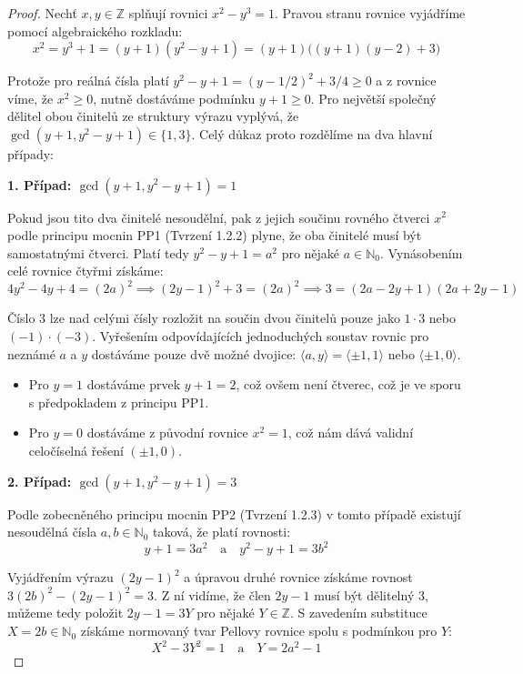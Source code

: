\documentclass[a4paper,12pt]{article}
\begin{document}
\begin{proof}
Nechť $x, y \in \mathbb{Z}$ splňují rovnici $x^2 - y^3 = 1$. Pravou stranu rovnice vyjádříme pomocí algebraického rozkladu:
$$x^2 = y^3 + 1 = (y + 1)(y^2 - y + 1) = (y + 1)\big((y + 1)(y - 2) + 3\big)$$ 

Protože pro reálná čísla platí $y^2 - y + 1 = (y - 1/2)^2 + 3/4 \ge 0$ a z rovnice víme, že $x^2 \ge 0$, nutně dostáváme podmínku $y + 1 \ge 0$. Pro největší společný dělitel obou činitelů ze struktury výrazu vyplývá, že $\gcd(y + 1, y^2 - y + 1) \in \{1, 3\}$. Celý důkaz proto rozdělíme na dva hlavní případy:

\textbf{1. Případ: $\gcd(y + 1, y^2 - y + 1) = 1$}
\vspace{0.5em}

Pokud jsou tito dva činitelé nesoudělní, pak z jejich součinu rovného čtverci $x^2$ podle principu mocnin PP1 (Tvrzení 1.2.2) plyne, že oba činitelé musí být samostatnými čtverci. Platí tedy $y^2 - y + 1 = a^2$ pro nějaké $a \in \mathbb{N}_0$. Vynásobením celé rovnice čtyřmi získáme:
$$4y^2 - 4y + 4 = (2a)^2 \implies (2y - 1)^2 + 3 = (2a)^2 \implies 3 = (2a - 2y + 1)(2a + 2y - 1)$$ 

Číslo 3 lze nad celými čísly rozložit na součin dvou činitelů pouze jako $1 \cdot 3$ nebo $(-1) \cdot (-3)$. Vyřešením odpovídajících jednoduchých soustav rovnic pro neznámé $a$ a $y$ dostáváme pouze dvě možné dvojice: $\langle a, y \rangle = \langle \pm1, 1 \rangle$ nebo $\langle \pm1, 0 \rangle$.
\begin{itemize}
    \item Pro $y = 1$ dostáváme prvek $y + 1 = 2$, což ovšem není čtverec, což je ve sporu s předpokladem z principu PP1.
    \item Pro $y = 0$ dostáváme z původní rovnice $x^2 = 1$, což nám dává validní celočíselná řešení $(\pm1, 0)$.
\end{itemize}

\vspace{1em}
\textbf{2. Případ: $\gcd(y + 1, y^2 - y + 1) = 3$}
\vspace{0.5em}

Podle zobecněného principu mocnin PP2 (Tvrzení 1.2.3) v tomto případě existují nesoudělná čísla $a, b \in \mathbb{N}_0$ taková, že platí rovnosti:
$$y + 1 = 3a^2 \quad \text{a} \quad y^2 - y + 1 = 3b^2$$ 

Vyjádřením výrazu $(2y - 1)^2$ a úpravou druhé rovnice získáme rovnost $3(2b)^2 - (2y - 1)^2 = 3$. Z ní vidíme, že člen $2y - 1$ musí být dělitelný 3, můžeme tedy položit $2y - 1 = 3Y$ pro nějaké $Y \in \mathbb{Z}$. S zavedením substituce $X = 2b \in \mathbb{N}_0$ získáme normovaný tvar Pellovy rovnice spolu s podmínkou pro $Y$:
$$X^2 - 3Y^2 = 1 \quad \text{a} \quad Y = 2a^2 - 1$$ 


\end{proof}
\end{document}
